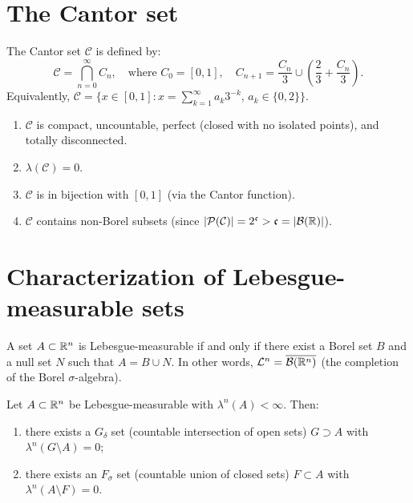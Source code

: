 \section{The Cantor set}

\begin{definition}
The Cantor set $\mathcal{C}$ is defined by:
\[
\mathcal{C} = \bigcap_{n=0}^{\infty} C_n, \quad \text{where }
C_0 = [0,1], \quad C_{n+1} = \frac{C_n}{3} \cup \left(\frac{2}{3} +
\frac{C_n}{3}\right).
\]
Equivalently, $\mathcal{C} = \{x \in [0,1] : x = \sum_{k=1}^{\infty}
a_k 3^{-k},\, a_k \in \{0, 2\}\}$.
\end{definition}

\begin{proposition}
\begin{enumerate}
    \item $\mathcal{C}$ is compact, uncountable, perfect (closed with no isolated
    points), and totally disconnected.
    \item $\lambda(\mathcal{C}) = 0$.
    \item $\mathcal{C}$ is in bijection with $[0,1]$ (via the Cantor function).
    \item $\mathcal{C}$ contains non-Borel subsets (since
    $\left| \mathcal{P}(\mathcal{C}) \right| = 2^{\mathfrak{c}} > \mathfrak{c} =
    \left| \mathcal{B}(\mathbb{R}) \right|$).
\end{enumerate}
\end{proposition}

\section{Characterization of Lebesgue-measurable sets}

\begin{theorem}
A set $A \subset \mathbb{R}^n$ is Lebesgue-measurable if and only if there exist a Borel set
$B$ and a null set $N$ such that $A = B \cup N$. In other words,
$\mathcal{L}^n = \overline{\mathcal{B}(\mathbb{R}^n)}$ (the completion of the Borel
$\sigma$-algebra).
\end{theorem}

\begin{theorem}
Let $A \subset \mathbb{R}^n$ be Lebesgue-measurable with $\lambda^n(A) < \infty$. Then:
\begin{enumerate}
    \item there exists a $G_\delta$ set (countable intersection of open sets)
    $G \supset A$ with $\lambda^n(G \setminus A) = 0$;
    \item there exists an $F_\sigma$ set (countable union of closed sets)
    $F \subset A$ with $\lambda^n(A \setminus F) = 0$.
\end{enumerate}
\end{theorem}

